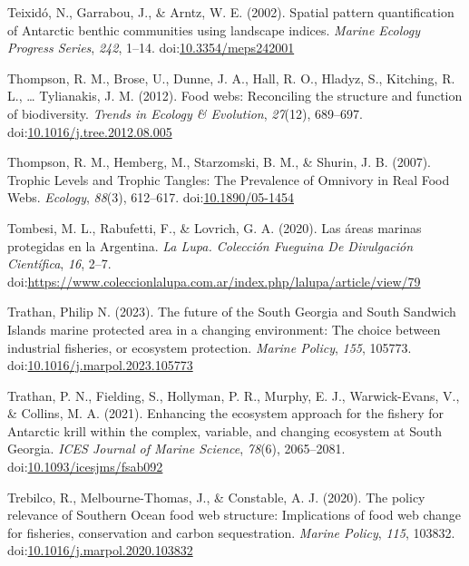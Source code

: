 \documentclass[
]{article}
\newlength{\cslhangindent}
\newlength{\cslentryspacingunit} %
\newenvironment{CSLReferences}[2] %
 {%
  \setlength{\parindent}{0pt}
  \ifodd #1
  \let\oldpar\par
  \def\par{\hangindent=\cslhangindent\oldpar}
  \fi
  \setlength{\parskip}{#2\cslentryspacingunit}
 }%
 {}
\begin{document}
\begin{CSLReferences}{1}{0}
\leavevmode{}%
Teixidó, N., Garrabou, J., \& Arntz, W. E. (2002). Spatial pattern
quantification of {Antarctic} benthic communities using landscape
indices. \emph{Marine Ecology Progress Series}, \emph{242}, 1--14.
doi:\href{https://doi.org/10.3354/meps242001}{10.3354/meps242001}

\leavevmode{}%
Thompson, R. M., Brose, U., Dunne, J. A., Hall, R. O., Hladyz, S.,
Kitching, R. L., \ldots{} Tylianakis, J. M. (2012). Food webs:
Reconciling the structure and function of biodiversity. \emph{Trends in
Ecology \& Evolution}, \emph{27}(12), 689--697.
doi:\href{https://doi.org/10.1016/j.tree.2012.08.005}{10.1016/j.tree.2012.08.005}

\leavevmode{}%
Thompson, R. M., Hemberg, M., Starzomski, B. M., \& Shurin, J. B.
(2007). Trophic {Levels} and {Trophic Tangles}: {The Prevalence} of
{Omnivory} in {Real Food Webs}. \emph{Ecology}, \emph{88}(3), 612--617.
doi:\href{https://doi.org/10.1890/05-1454}{10.1890/05-1454}

\leavevmode{}%
Tombesi, M. L., Rabufetti, F., \& Lovrich, G. A. (2020). Las áreas
marinas protegidas en la {Argentina}. \emph{La Lupa. Colección Fueguina
De Divulgación Científica}, \emph{16}, 2--7.
doi:\url{https://www.coleccionlalupa.com.ar/index.php/lalupa/article/view/79}

\leavevmode{}%
Trathan, Philip N. (2023). The future of the {South Georgia} and {South
Sandwich Islands} marine protected area in a changing environment: {The}
choice between industrial fisheries, or ecosystem protection.
\emph{Marine Policy}, \emph{155}, 105773.
doi:\href{https://doi.org/10.1016/j.marpol.2023.105773}{10.1016/j.marpol.2023.105773}

\leavevmode{}%
Trathan, P. N., Fielding, S., Hollyman, P. R., Murphy, E. J.,
Warwick-Evans, V., \& Collins, M. A. (2021). Enhancing the ecosystem
approach for the fishery for {Antarctic} krill within the complex,
variable, and changing ecosystem at {South Georgia}. \emph{ICES Journal
of Marine Science}, \emph{78}(6), 2065--2081.
doi:\href{https://doi.org/10.1093/icesjms/fsab092}{10.1093/icesjms/fsab092}

\leavevmode{}%
Trebilco, R., Melbourne-Thomas, J., \& Constable, A. J. (2020). The
policy relevance of {Southern Ocean} food web structure: {Implications}
of food web change for fisheries, conservation and carbon sequestration.
\emph{Marine Policy}, \emph{115}, 103832.
doi:\href{https://doi.org/10.1016/j.marpol.2020.103832}{10.1016/j.marpol.2020.103832}


\end{CSLReferences}
\end{document}
